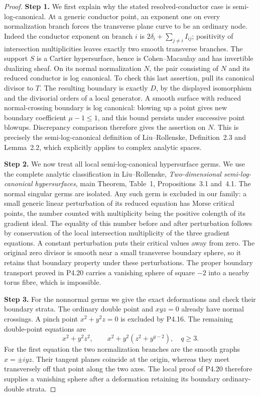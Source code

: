 \begin{proof}
\noindent\textbf{Step 1.} We first explain why the stated resolved-conductor
case is semi-log-canonical. At a generic conductor
point, an exponent one on every normalization
branch forces the transverse plane curve to be an
ordinary node. Indeed the conductor exponent on
branch $i$ is
$2\delta_i+\sum_{j\ne i}I_{ij}$; positivity of
intersection multiplicities leaves exactly two
smooth transverse branches. The support $S$ is a
Cartier hypersurface, hence is Cohen--Macaulay and
has invertible dualizing sheaf. On its normal
normalization $N$, the pair consisting of $N$
and its reduced conductor is log canonical.
To check this last assertion, pull its canonical
divisor to $T$. The resulting boundary is exactly
$D$, by the displayed isomorphism and the
divisorial orders of a local generator. A smooth
surface with reduced normal-crossing boundary is
log canonical: blowing up a point gives new
boundary coefficient $\mu-1\le1$, and this
bound persists under successive point blowups.
Discrepancy comparison therefore gives the
assertion on $N$. This is precisely the
semi-log-canonical definition of
Liu--Rollenske, Definition~2.3 and Lemma~2.2,
which explicitly applies to complex analytic
spaces.

\noindent\textbf{Step 2.} We now treat all local semi-log-canonical
hypersurface germs. We use the complete analytic
classification in Liu--Rollenske,
\emph{Two-dimensional semi-log-canonical
hypersurfaces}, main Theorem, Table~1,
Propositions~3.1 and~4.1. The normal singular
germs are isolated. Any such germ is excluded
in our family: a small generic linear
perturbation of its reduced equation has
Morse critical points, the number counted
with multiplicity being the positive
colength of its gradient ideal. The equality
of this number before and after perturbation
follows by conservation of the local
intersection multiplicity of the three
gradient equations. A constant perturbation
puts their critical values away from zero.
The original zero divisor is smooth near
a small transverse boundary sphere, so it
retains that boundary property under these
perturbations. The proper boundary
transport proved in P4.20 carries a
vanishing sphere of square $-2$ into a
nearby torus fibre, which is impossible.

\noindent\textbf{Step 3.} For the nonnormal germs we give the exact
deformations and check their boundary strata.
The ordinary double point and $xyz=0$
already have normal crossings. A pinch point
$x^2+y^2z=0$ is excluded by P4.16.
The remaining double-point equations are
\[
 x^2+y^2z^2,\qquad
 x^2+y^2(z^2+y^{q-2}),\quad q\ge3.
\]
For the first equation the two normalization
branches are the smooth graphs $x=\pm i yz$.
Their tangent planes coincide at the origin,
whereas they meet transversely off that point
along the two axes. The local proof of P4.20
therefore supplies a vanishing sphere after
a deformation retaining its boundary
ordinary-double strata.


\end{proof}
